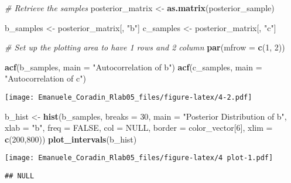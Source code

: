 \documentclass[
]{article}
\newenvironment{Shaded}{\begin{snugshade}}{\end{snugshade}}
\newcommand{\AttributeTok}[1]{\textcolor[rgb]{0.13,0.29,0.53}{#1}}
\newcommand{\CommentTok}[1]{\textcolor[rgb]{0.56,0.35,0.01}{\textit{#1}}}
\newcommand{\ConstantTok}[1]{\textcolor[rgb]{0.56,0.35,0.01}{#1}}
\newcommand{\DecValTok}[1]{\textcolor[rgb]{0.00,0.00,0.81}{#1}}
\newcommand{\FunctionTok}[1]{\textcolor[rgb]{0.13,0.29,0.53}{\textbf{#1}}}
\newcommand{\NormalTok}[1]{#1}
\newcommand{\OtherTok}[1]{\textcolor[rgb]{0.56,0.35,0.01}{#1}}
\newcommand{\StringTok}[1]{\textcolor[rgb]{0.31,0.60,0.02}{#1}}
\begin{document}
\begin{Shaded}
\begin{Highlighting}[]
\CommentTok{\# Retrieve the samples}
\NormalTok{posterior\_matrix }\OtherTok{\textless{}{-}} \FunctionTok{as.matrix}\NormalTok{(posterior\_sample)}

\NormalTok{b\_samples }\OtherTok{\textless{}{-}}\NormalTok{ posterior\_matrix[, }\StringTok{"b"}\NormalTok{]}
\NormalTok{c\_samples }\OtherTok{\textless{}{-}}\NormalTok{ posterior\_matrix[, }\StringTok{"c"}\NormalTok{]}

\CommentTok{\# Set up the plotting area to have 1 rows and 2 column}
\FunctionTok{par}\NormalTok{(}\AttributeTok{mfrow =} \FunctionTok{c}\NormalTok{(}\DecValTok{1}\NormalTok{, }\DecValTok{2}\NormalTok{))  }

\FunctionTok{acf}\NormalTok{(b\_samples, }\AttributeTok{main =} \StringTok{"Autocorrelation of b"}\NormalTok{)}
\FunctionTok{acf}\NormalTok{(c\_samples, }\AttributeTok{main =} \StringTok{"Autocorrelation of c"}\NormalTok{)}
\end{Highlighting}
\end{Shaded}

\texttt{[image: Emanuele\_Coradin\_Rlab05\_files/figure-latex/4-2.pdf]}

\begin{Shaded}
\begin{Highlighting}[]
\NormalTok{b\_hist }\OtherTok{\textless{}{-}} \FunctionTok{hist}\NormalTok{(b\_samples, }\AttributeTok{breaks =} \DecValTok{30}\NormalTok{, }\AttributeTok{main =} \StringTok{"Posterior Distribution of b"}\NormalTok{, }\AttributeTok{xlab =} \StringTok{"b"}\NormalTok{, }\AttributeTok{freq =} \ConstantTok{FALSE}\NormalTok{, }\AttributeTok{col =} \ConstantTok{NULL}\NormalTok{, }\AttributeTok{border =}\NormalTok{ color\_vector[}\DecValTok{6}\NormalTok{], }\AttributeTok{xlim =} \FunctionTok{c}\NormalTok{(}\DecValTok{200}\NormalTok{,}\DecValTok{800}\NormalTok{))}
\FunctionTok{plot\_intervals}\NormalTok{(b\_hist)}
\end{Highlighting}
\end{Shaded}

\texttt{[image: Emanuele\_Coradin\_Rlab05\_files/figure-latex/4 plot-1.pdf]}

\begin{verbatim}
## NULL
\end{verbatim}
\end{document}
